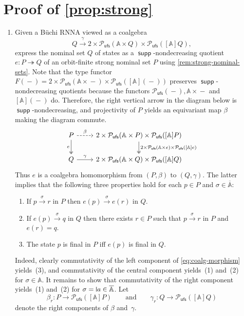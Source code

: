 \documentclass[10pt,a4paper]{amsart}
\newcommand{\midmid}{\hspace{0.2ex}{\rule[-0.1ex]{0.6pt}{1.65ex}}\hspace{0.2ex}}
\newcommand{\newletter}[1]{{\midmid}#1}
\newcommand{\barA}{\overline{\names}}
\numberwithin{equation}{section}
\newcommand{\epito}{\twoheadrightarrow}
\newcommand{\xto}[1]{\xrightarrow{~#1~}}
\newcommand{\dash}{\mathop{-}}
\newcommand{\+}[1]{\mathcal{#1}\xspace}
\newcommand{\Pow}{\mathcal{P}}
\newcommand{\ufs}{{\mathsf{ufs}}}
\newcommand{\names}{\mathbb{A}}
\DeclareMathOperator{\supp}{\mathsf{supp}} %
\theoremstyle{definition}
\begin{document}
\section*{Proof of \autoref{prop:strong}}
  \begin{enumerate}
  \item Given a Büchi RNNA viewed as a coalgebra
    \[
      Q\xto{\gamma} 2\times \Pow_\ufs(\names\times Q)\times
      \Pow_\ufs([\names]Q),
    \]
    express the nominal set $Q$ of states as a $\supp$-nondecreasing
    quotient $e\colon P\epito Q$ of an orbit-finite strong nominal set
    $P$ using \autoref{rem:strong-nominal-sets}. Note that the type
    functor
    $F(\dash) = 2\times \Pow_\ufs(\names\times \dash)\times
    \Pow_\ufs([\names](\dash))$ preserves $\supp$-nondecreasing quotients
    because the functors
    $\Pow_\ufs(\dash), \names\times \dash$ and $[\names](\dash)$
    do. Therefore, the right vertical arrow in the diagram below is
    $\supp$-nondecreasing, and projectivity of $P$ yields an equivariant
    map $\beta$ making the diagram commute.
    \begin{equation}\label{eq:coalg-morphism}
      \begin{tikzcd}
        P \ar[d,"e"', two heads] \ar[dashed]{r}{\beta}
        &
        2\times \Pow_\ufs(\names\times P)\times \Pow_\ufs([\names]P)
        \ar[d,"2\times \Pow_\ufs(\names\times e)\times
        \Pow_\ufs({[\names]}e)", two heads]
        \\
        Q \ar[r,"\gamma"]
        &
        2\times \Pow_\ufs(\names\times Q)\times \Pow_\ufs([\names]Q) 
      \end{tikzcd}
    \end{equation}
    Thus $e$ is a coalgebra homomorphism from $(P,\beta)$ to
    $(Q,\gamma)$. The latter implies that the following three
    properties hold for each $p\in P$ and $\sigma\in \barA$:
    \begin{enumerate}[(1)]
    \item\label{hom1} If $p\xto{\sigma} r$ in $P$ then $e(p)\xto{\sigma} e(r)$ in $Q$.
    \item\label{hom2} If $e(p)\xto{\sigma} q$ in $Q$ then there exists
      $r\in P$ such that $p\xto{\sigma} r$ in $P$ and $e(r)=q$.
    \item\label{hom3} The state $p$ is final in $P$ iff $e(p)$ is final in $Q$.
    \end{enumerate}
    Indeed, clearly commutativity of the left component of
    \eqref{eq:coalg-morphism} yields~(3), and commutativity of the
    central component yields~(1) and~(2) for
    $\sigma\in \names$. It remains to show that commutativity of the right
    component yields~(1) and~(2) for $\sigma=\newletter a\in \barA$. Let
    \[\beta_r\colon P\to \Pow_\ufs([\names]P)\qquad\text{and}\qquad \gamma_r\colon Q\to \Pow_\ufs([\names]Q)\] denote the right
    components of $\beta$ and~$\gamma$.


\end{enumerate}
\end{document}
